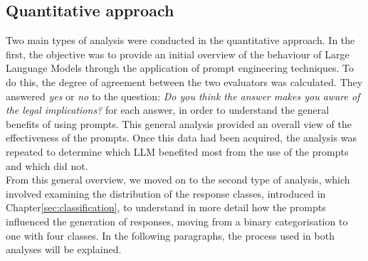 \subsection{Quantitative approach}
Two main types of analysis were conducted in the quantitative approach. In the first, the objective was to provide an initial overview of the behaviour of Large Language Models through the application of prompt engineering techniques. To do this, the degree of agreement between the two evaluators was calculated. They answered \textit{yes} or \textit{no} to the question: \textit{Do you think the answer makes you aware of the legal implications?} for each answer, in order to understand the general benefits of using prompts. This general analysis provided an overall view of the effectiveness of the prompts. Once this data had been acquired, the analysis was repeated to determine which LLM benefited most from the use of the prompts and which did not.\\
From this general overview, we moved on to the second type of analysis, which involved examining the distribution of the response classes, introduced in Chapter\ref{sec:classification}, to understand in more detail how the prompts influenced the generation of responses, moving from a binary categorisation to one with four classes. In the following paragraphs, the process used in both analyses will be explained.
